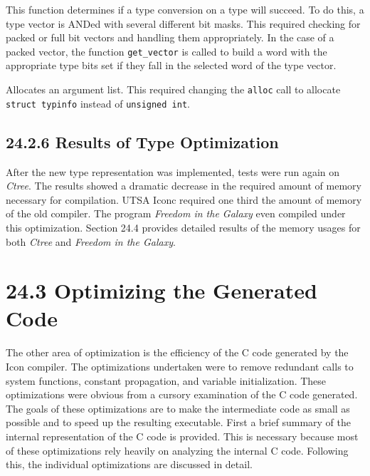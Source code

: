 
This function determines if a type conversion on a type will
succeed. To do this, a type vector is ANDed with several different bit
masks. This required checking for packed or full bit vectors and
handling them appropriately. In the case of a packed vector, the
function \texttt{get\_vector} is called to build a word with the
appropriate type bits set if they fall in the selected word of the
type vector.


Allocates an argument list. This required changing the
\texttt{alloc} call to allocate \texttt{struct typinfo} instead of
\texttt{unsigned int}.

\subsection[24.2.6 Results of Type Optimization]{24.2.6 Results of Type Optimization}

After the new type representation was implemented, tests were run
again on \textit{Ctree}. The results showed a dramatic decrease in the
required amount of memory necessary for compilation. UTSA Iconc
required one third the amount of memory of the old compiler. The
program \textit{Freedom in the Galaxy} even compiled under this
optimization. Section 24.4 provides detailed results of the memory
usages for both \textit{Ctree} and \textit{Freedom in the Galaxy}.

\section[24.3 Optimizing the Generated Code]{24.3 Optimizing the Generated Code}

The other area of optimization is the efficiency of the C code
generated by the Icon compiler. The optimizations undertaken were to
remove redundant calls to system functions, constant propagation, and
variable initialization. These optimizations were obvious from a
cursory examination of the C code generated. The goals of these
optimizations are to make the intermediate code as small as possible
and to speed up the resulting executable. First a brief summary of
the internal representation of the C code is provided. This is
necessary because most of these optimizations rely heavily on
analyzing the internal C code. Following this, the individual
optimizations are discussed in detail.

